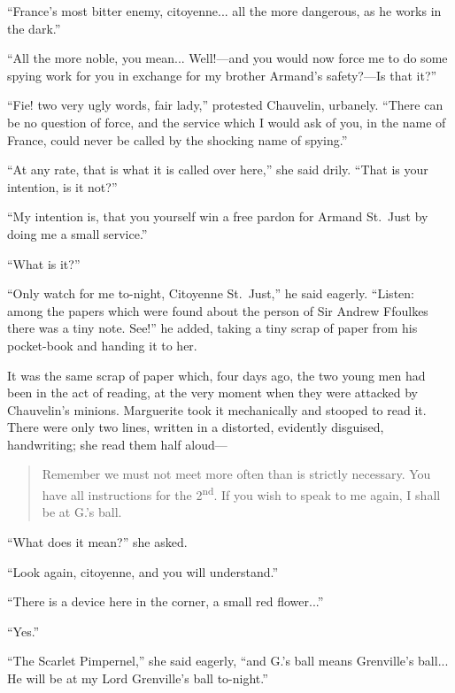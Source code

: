\documentclass[paper=a5,BCOR=7mm,twoside,DIV=calc,12pt,usegeometry,chapterprefix,endperiod,headings=big]{scrbook}
\begin{document}
\enquote{France's most bitter enemy, citoyenne... all the more dangerous, as he works in the dark.}

\enquote{All the more noble, you mean... Well!---and you would now force me to do some spying work for you in exchange for my brother Armand's safety?---Is that it?}

\enquote{Fie! two very ugly words, fair lady,} protested Chauvelin, urbanely. \enquote{There can be no question of force, and the service which I would ask of you, in the name of France, could never be called by the shocking name of spying.}

\enquote{At any rate, that is what it is called over here,} she said drily. \enquote{That is your intention, is it not?}

\enquote{My intention is, that you yourself win a free pardon for Armand St.~Just by doing me a small service.}

\enquote{What is it?}

\enquote{Only watch for me to-night, Citoyenne St.~Just,} he said eagerly. \enquote{Listen: among the papers which were found about the person of Sir Andrew Ffoulkes there was a tiny note. See!} he added, taking a tiny scrap of paper from his pocket-book and handing it to her.

It was the same scrap of paper which, four days ago, the two young men had been in the act of reading, at the very moment when they were attacked by Chauvelin's minions. Marguerite took it mechanically and stooped to read it. There were only two lines, written in a distorted, evidently disguised, handwriting; she read them half aloud---

\blockquote{Remember we must not meet more often than is strictly necessary. You have all instructions for the 2\textsuperscript{nd}. If you wish to speak to me again, I shall be at G.'s ball.}

\enquote{What does it mean?} she asked.

\enquote{Look again, citoyenne, and you will understand.}

\enquote{There is a device here in the corner, a small red flower...}

\enquote{Yes.}

\enquote{The Scarlet Pimpernel,} she said eagerly, \enquote{and G.’s ball means Grenville's ball... He will be at my Lord Grenville's ball to-night.}
\end{document}
